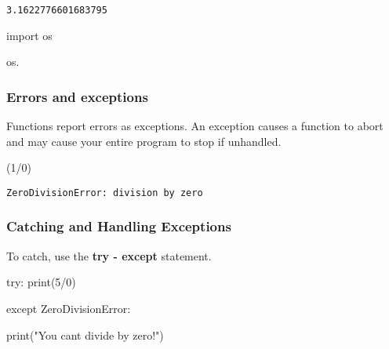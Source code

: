 \documentclass[
  letterpaper,
  DIV=11,
  numbers=noendperiod]{scrreprt}
\newenvironment{Shaded}{\begin{snugshade}}{\end{snugshade}}
\newcommand{\BuiltInTok}[1]{\textcolor[rgb]{0.00,0.46,0.62}{#1}}
\newcommand{\BuiltInTok}[1]{\textcolor[rgb]{0.00,0.48,0.65}{#1}}
\newcommand{\ControlFlowTok}[1]{\textcolor[rgb]{0.00,0.46,0.62}{#1}}
\newcommand{\ControlFlowTok}[1]{\textcolor[rgb]{0.00,0.48,0.65}{#1}}
\newcommand{\DecValTok}[1]{\textcolor[rgb]{0.68,0.00,0.00}{#1}}
\newcommand{\ImportTok}[1]{\textcolor[rgb]{0.00,0.46,0.62}{#1}}
\newcommand{\NormalTok}[1]{\textcolor[rgb]{0.00,0.46,0.62}{#1}}
\newcommand{\OperatorTok}[1]{\textcolor[rgb]{0.37,0.37,0.37}{#1}}
\newcommand{\PreprocessorTok}[1]{\textcolor[rgb]{0.68,0.00,0.00}{#1}}
\newcommand{\ImportTok}[1]{\textcolor[rgb]{0.00,0.48,0.65}{#1}}
\newcommand{\NormalTok}[1]{\textcolor[rgb]{0.00,0.48,0.65}{#1}}
\newcommand{\OperatorTok}[1]{\textcolor[rgb]{0.37,0.37,0.37}{#1}}
\newcommand{\PreprocessorTok}[1]{\textcolor[rgb]{0.68,0.00,0.00}{#1}}
\newcommand{\StringTok}[1]{\textcolor[rgb]{0.13,0.47,0.30}{#1}}
\begin{document}
\begin{Shaded}
\begin{Highlighting}[]
\begin{verbatim}
3.1622776601683795
\end{verbatim}

\begin{Shaded}
\begin{Highlighting}[]
\ImportTok{import}\NormalTok{ os}

\NormalTok{os.}
\end{Highlighting}
\end{Shaded}

\hypertarget{errors-and-exceptions}{%
\subsubsection{Errors and exceptions}\label{errors-and-exceptions}}

Functions report errors as exceptions. An exception causes a function to
abort and may cause your entire program to stop if unhandled.

\begin{Shaded}
\begin{Highlighting}[]
\NormalTok{(}\DecValTok{1}\OperatorTok{/}\DecValTok{0}\NormalTok{)}
\end{Highlighting}
\end{Shaded}

\begin{verbatim}
ZeroDivisionError: division by zero
\end{verbatim}

\hypertarget{catching-and-handling-exceptions}{%
\subsubsection{Catching and Handling
Exceptions}\label{catching-and-handling-exceptions}}

To catch, use the \textbf{try - except} statement.

\begin{Shaded}
\begin{Highlighting}[]
\ControlFlowTok{try}\NormalTok{: }
    \BuiltInTok{print}\NormalTok{(}\DecValTok{5}\OperatorTok{/}\DecValTok{0}\NormalTok{) }
    
\ControlFlowTok{except} \PreprocessorTok{ZeroDivisionError}\NormalTok{: }
    
    \BuiltInTok{print}\NormalTok{(}\StringTok{"You can\textquotesingle{}t divide by zero!"}\NormalTok{)}
\end{Highlighting}
\end{Shaded}


\end{Highlighting}
\end{Shaded}
\end{document}
